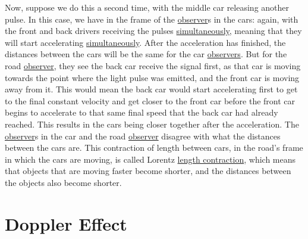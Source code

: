 Now, suppose we do this a second time, with the middle car releasing another pulse.
In this case, we have in the frame of the \hyperlink{def-observer}{observer}s in the cars: again, with the front and back drivers receiving the pulses \hyperlink{def-simultaneity}{simultaneously}, meaning that they will start accelerating \hyperlink{def-simultaneity}{simultaneously}.
After the acceleration has finished, the distances between the cars will be the same for the car \hyperlink{def-observer}{observers}.
But for the road \hyperlink{def-observer}{observer}, they see the back car receive the signal first, as that car is moving towards the point where the light pulse was emitted, and the front car is moving away from it.
This would mean the back car would start accelerating first to get to the final constant velocity and get closer to the front car before the front car begins to accelerate to that same final speed that the back car had already reached.
This results in the cars being closer together after the acceleration.
The \hyperlink{def-observer}{observer}s in the car and the road \hyperlink{def-observer}{observer} disagree with what the distances between the cars are.
This contraction of length between cars, in the road's frame in which the cars are moving, is called Lorentz \hyperlink{def-length-contraction}{length contraction}, which means that objects that are moving faster become shorter, and the distances between the objects also become shorter.

\section{Doppler Effect} \label{sect: Intro Doppler Effect}

